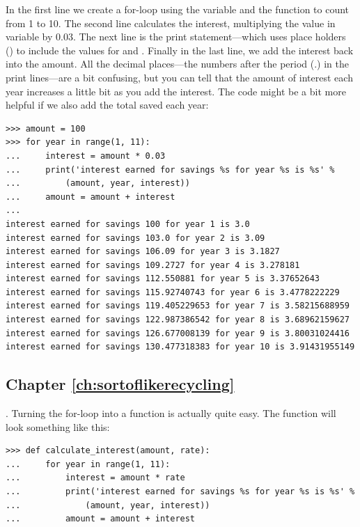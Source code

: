 In the first line we create a for-loop using the variable  and the function  to count from 1 to 10.  The second line calculates the interest, multiplying the value in variable  by 0.03.  The next line is the print statement---which uses place holders () to include the values for  and .  Finally in the last line, we add the interest back into the amount.
All the decimal places---the numbers after the period (.) in the print lines---are a bit confusing, but you can tell that the amount of interest each year increases a little bit as you add the interest.
The code might be a bit more helpful if we also add the total saved each year:

\begin{listing}
\begin{verbatim}
>>> amount = 100
>>> for year in range(1, 11):
...     interest = amount * 0.03
...     print('interest earned for savings %s for year %s is %s' % 
...         (amount, year, interest))
...     amount = amount + interest
... 
interest earned for savings 100 for year 1 is 3.0
interest earned for savings 103.0 for year 2 is 3.09
interest earned for savings 106.09 for year 3 is 3.1827
interest earned for savings 109.2727 for year 4 is 3.278181
interest earned for savings 112.550881 for year 5 is 3.37652643
interest earned for savings 115.92740743 for year 6 is 3.4778222229
interest earned for savings 119.405229653 for year 7 is 3.58215688959
interest earned for savings 122.987386542 for year 8 is 3.68962159627
interest earned for savings 126.677008139 for year 9 is 3.80031024416
interest earned for savings 130.477318383 for year 10 is 3.91431955149
\end{verbatim}
\end{listing}

\subsection*{Chapter \ref{ch:sortoflikerecycling}}

. Turning the for-loop into a function is actually quite easy.  The function will look something like this:

\begin{listing}
\begin{verbatim}
>>> def calculate_interest(amount, rate):
...     for year in range(1, 11):
...         interest = amount * rate
...         print('interest earned for savings %s for year %s is %s' % 
...             (amount, year, interest))
...         amount = amount + interest
\end{verbatim}
\end{listing}

